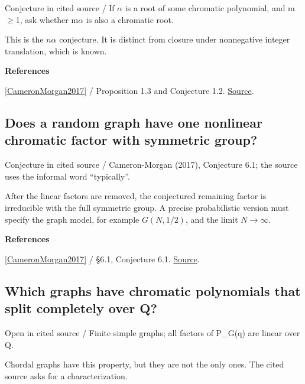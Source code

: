 \documentclass[11pt,a4paper,oneside,openany]{book}
\newenvironment{sources}{\par\smallskip\begingroup\footnotesize\color{atlasgray}\leftskip=10pt\setlength{\parskip}{2pt}}{\par\endgroup\smallskip}
\begin{document}
{\small\sffamily\color{atlasgold}Conjecture in cited source / If \ensuremath{\alpha} is a root of some chromatic polynomial, and m\ensuremath{\ge}1, ask whether m\ensuremath{\alpha} is also a chromatic root.}\par\smallskip
\color{black} This is the \(n\alpha\) conjecture. It is distinct from closure under nonnegative integer translation, which is known.\par
\begin{sources}
\textbf{References}\par\smallskip
\noindent\hyperlink{ref:CameronMorgan2017}{[CameronMorgan2017]} / Proposition 1.3 and Conjecture 1.2.  \href{https://doi.org/10.37236/6578}{Source}.\par
\end{sources}\color{black}
\subsection*{Does a random graph have one nonlinear chromatic factor with symmetric group?}
{\small\sffamily\color{atlasgold}Conjecture in cited source / Cameron-Morgan (2017), Conjecture 6.1; the source uses the informal word ``typically''.}\par\smallskip
\color{black} After the linear factors are removed, the conjectured remaining factor is irreducible with the full symmetric group. A precise probabilistic version must specify the graph model, for example \(G(N,1/2)\), and the limit \(N\to\infty\).\par
\begin{sources}
\textbf{References}\par\smallskip
\noindent\hyperlink{ref:CameronMorgan2017}{[CameronMorgan2017]} / §6.1, Conjecture 6.1.  \href{https://doi.org/10.37236/6578}{Source}.\par
\end{sources}\color{black}
\subsection*{Which graphs have chromatic polynomials that split completely over Q?}
{\small\sffamily\color{atlasgold}Open in cited source / Finite simple graphs; all factors of P\_\allowbreak{}G(q) are linear over Q.}\par\smallskip
\color{black} Chordal graphs have this property, but they are not the only ones. The cited source asks for a characterization.\par
\end{document}
